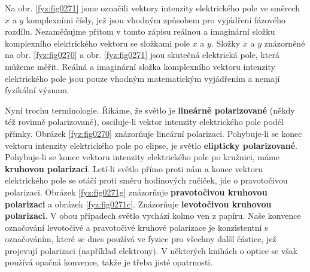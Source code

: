     Na obr. \ref{fyz:fig0271} jsme označili vektory intenzity elektrického pole ve směrech \(x\) a
    \(y\) komplexními čísly, jež jsou vhodným způsobem pro vyjádření fázového rozdílu. Nezaměňujme
    přitom v tomto zápisu reálnou a imaginární složku komplexního elektrického vektoru se složkami
    pole \(x\) a \(y\). Složky \(x\) a \(y\) znázorněné na obr. \ref{fyz:fig0270} a obr.
    \ref{fyz:fig0271} jsou skutečná elektrická pole, která můžeme měřit. Reálná a imaginární složka
    komplexního vektoru intenzity elektrického pole jsou pouze vhodným matematickým vyjádřením a
    nemají fyzikální význam.

    Nyní trochu terminologie. Říkáme, že světlo je \textbf{lineárně polarizované} (někdy též rovinně
    polarizované), osciluje-li vektor intenzity elektrického pole podél přímky. Obrázek
    \ref{fyz:fig0270} znázorňuje lineární polarizaci. Pohybuje-li se konec vektoru intenzity
    elektrického pole po elipse, je světlo \textbf{elipticky polarizované}. Pohybuje-li se konec
    vektoru intenzity elektrického pole po kružnici, máme \textbf{kruhovou polarizaci}. Letí-li
    světlo přímo proti nám a konec vektoru elektrického pole se otáčí proti směru hodinových
    ručiček, jde o pravotočivou polarizaci. Obrázek \ref{fyz:fig0271g} znázorňuje
    \textbf{pravotočivou kruhovou polarizaci} a obrázek \ref{fyz:fig0271c}. Znázorňuje
    \textbf{levotočivou kruhovou polarizaci}. V obou případech světlo vychází kolmo ven z papíru.
    Naše konvence označování levotočivé a pravotočivé kruhové polarizace je konzistentní s
    označováním, které se dnes používá ve fyzice pro všechny další částice, jež projevují polarizaci
    (například elektrony). V některých knihách o optice se však používá opačná konvence, takže je
    třeba jisté opatrnosti.

